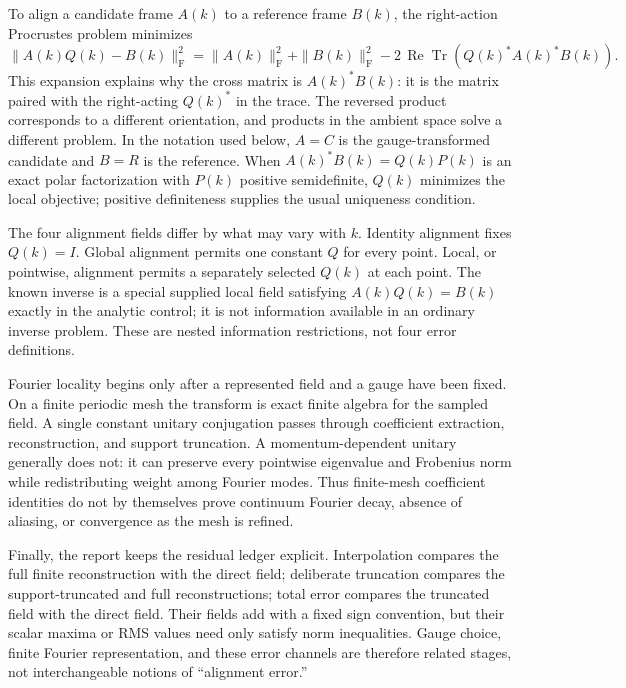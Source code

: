 \documentclass[11pt]{article}
\DeclareMathOperator{\Tr}{Tr}
\newcommand{\Frob}{\mathrm F}
\begin{document}
To align a candidate frame $A(k)$ to a reference frame $B(k)$, the right-action
Procrustes problem minimizes
\begin{equation}
 \|A(k)Q(k)-B(k)\|_\Frob^2
 =\|A(k)\|_\Frob^2+\|B(k)\|_\Frob^2
 -2\,\operatorname{Re}\Tr\!\left(Q(k)^*A(k)^*B(k)\right).
 \label{eq:primer-procrustes}
\end{equation}
This expansion explains why the cross matrix is $A(k)^*B(k)$: it is the matrix paired
with the right-acting $Q(k)^*$ in the trace. The reversed product corresponds to a
different orientation, and products in the ambient space solve a different problem. In
the notation used below, $A=C$ is the gauge-transformed candidate and $B=R$ is the reference.
When $A(k)^*B(k)=Q(k)P(k)$ is an exact polar factorization with $P(k)$ positive
semidefinite, $Q(k)$ minimizes the local objective; positive definiteness supplies the
usual uniqueness condition.

The four alignment fields differ by what may vary with $k$. Identity alignment fixes
$Q(k)=I$. Global alignment permits one constant $Q$ for every point. Local, or
pointwise, alignment permits a separately selected $Q(k)$ at each point. The known
inverse is a special supplied local field satisfying $A(k)Q(k)=B(k)$ exactly in the
analytic control; it is not information available in an ordinary inverse problem.
These are nested information restrictions, not four error definitions.

Fourier locality begins only after a represented field and a gauge have been fixed. On a
finite periodic mesh the transform is exact finite algebra for the sampled field. A
single constant unitary conjugation passes through coefficient extraction,
reconstruction, and support truncation. A momentum-dependent unitary generally does not:
it can preserve every pointwise eigenvalue and Frobenius norm while redistributing weight
among Fourier modes. Thus finite-mesh coefficient identities do not by themselves prove
continuum Fourier decay, absence of aliasing, or convergence as the mesh is refined.

Finally, the report keeps the residual ledger explicit. Interpolation compares the full
finite reconstruction with the direct field; deliberate truncation compares the
support-truncated and full reconstructions; total error compares the truncated field with
the direct field. Their fields add with a fixed sign convention, but their scalar maxima
or RMS values need only satisfy norm inequalities. Gauge choice, finite Fourier
representation, and these error channels are therefore related stages, not interchangeable
notions of ``alignment error.''
\end{document}
